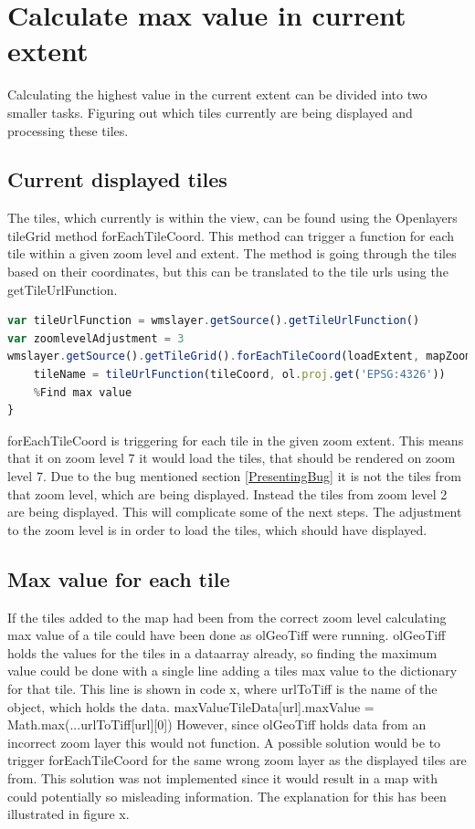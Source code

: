 \section{Calculate max value in current extent}
Calculating the highest value in the current extent can be divided into two smaller tasks. Figuring out which tiles currently are being displayed and processing these tiles.

\subsection{Current displayed tiles}

The tiles, which currently is within the view, can be found using the Openlayers tileGrid method forEachTileCoord. This method can trigger a function for each tile within a given zoom level and extent. 
The method is going through the tiles based on their coordinates, but this can be translated to the tile urls using the getTileUrlFunction.
\begin{lstlisting}[language=JavaScript, caption={The JavaScript in the project}, label= VoresJS,escapechar=|]
var tileUrlFunction = wmslayer.getSource().getTileUrlFunction()
var zoomlevelAdjustment = 3
wmslayer.getSource().getTileGrid().forEachTileCoord(loadExtent, mapZoom - zoomlevelAdjustment, function(tileCoord) {
	tileName = tileUrlFunction(tileCoord, ol.proj.get('EPSG:4326'))
	%Find max value
}
\end{lstlisting}
forEachTileCoord is triggering for each tile in the given zoom extent. This means that it on zoom level 7 it would load the tiles, that should be rendered on zoom level 7. Due to the bug mentioned section \ref{PresentingBug} it is not the tiles from that zoom level, which are being displayed. Instead the tiles from zoom level 2 are being displayed. This will complicate some of the next steps. 
The adjustment to the zoom level is in order to load the tiles, which should have displayed.

\subsection{Max value for each tile}
If the tiles added to the map had been from the correct zoom level calculating max value of a tile could have been done as olGeoTiff were running. olGeoTiff holds the values for the tiles in a dataarray already, so finding the maximum value could be done with a single line adding a tiles max value to the dictionary for that tile. This line is shown in code x, where urlToTiff is the name of the object, which holds the data.
maxValueTileData[url].maxValue = Math.max(...urlToTiff[url][0])
However, since olGeoTiff holds data from an incorrect zoom layer this would not function. A possible solution would be to trigger forEachTileCoord for the same wrong zoom layer as the displayed tiles are from. This solution was not implemented since it would result in a map with could potentially so misleading information. The explanation for this has been illustrated in figure x. 

